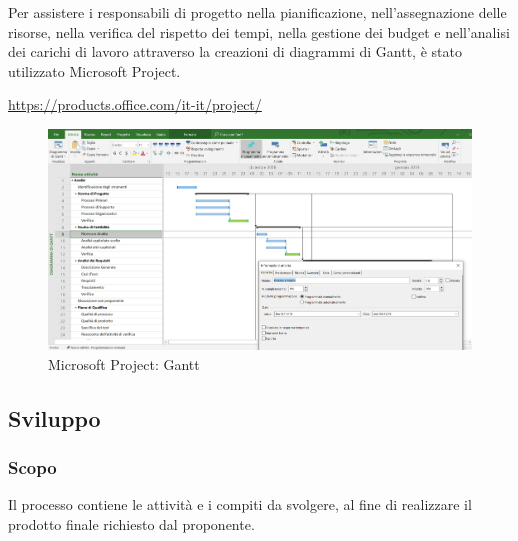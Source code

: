 \noindent Per assistere i responsabili di progetto nella pianificazione, 
nell'assegnazione delle risorse, nella verifica del rispetto dei tempi, nella 
gestione dei budget e nell'analisi dei carichi di lavoro attraverso la creazioni 
di diagrammi di Gantt\glo, è stato utilizzato Microsoft Project. \\
		\centerline{\url{https://products.office.com/it-it/project/}}
	\begin{figure}[H]
		\includegraphics[width=0.99\linewidth]{res/images/projectS.png}
		\caption{Microsoft Project: Gantt}
	\end{figure}
	 

		
		
     
\subsection{Sviluppo}

\subsubsection{Scopo}
Il processo contiene le attività e i compiti da svolgere, al fine di realizzare 
il prodotto finale richiesto dal proponente.

